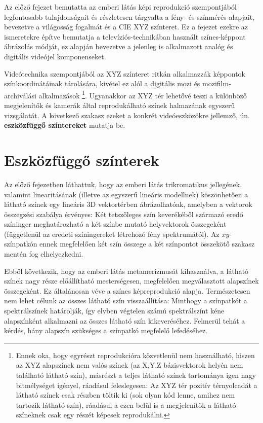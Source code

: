 Az előző fejezet bemutatta az emberi látás képi reprodukció szempontjából legfontosabb tulajdonságait és részletesen tárgyalta a fény- és színmérés alapjait, bevezetve a világosság fogalmát és a CIE XYZ színteret.
Ez a fejezet ezekre az ismeretekre építve bemutatja a televíziós-technikában használt színes-képpont ábrázolás módját, 
ez alapján bevezetve a jelenleg is alkalmazott analóg és digitális videójel komponenseket.

Videótechnika szempontjából az XYZ színteret ritkán alkalmazzák képpontok színkoordinátáinak tárolására, kivétel ez alól a digitális mozi és mozifilm-archiválási alkalmazások \footnote{Ennek oka, hogy egyrészt reprodukcióra közvetlenül nem használható, hiszen az XYZ alapszínek nem valós színek (az X,Y,Z bázisvektorok helyén nem található látható szín), másrészt a teljes látható színek tartománya igen nagy bitmélységet igényel, ráadásul feleslegesen:
Az XYZ tér pozitív térnyolcadát a látható színek csak részben töltik ki (sok olyan kód lenne, amihez nem tartozik látható szín), ráadásul a ezen belül is a megjelenítők a látható színeknek csak egy részét képesek reprodukálni.}.
Ugyanakkor az XYZ tér lehetővé teszi a különböző megjelenítők és kamerák által reprodukálható színek halmazának egyszerű vizsgálatát.
A következő szakasz ezeket a konkrét videóeszközökre jellemző, ún. \textbf{eszközfüggő színtereket} mutatja be.

\section{Eszközfüggő színterek}

Az előző fejezetben láthattuk, hogy az emberi látás trikromatikus jellegének, valamint linearitásának (illetve az egyszerű lineáris modellnek) köszönhetően a látható színek egy lineáris 3D vektortérben ábrázolhatóak, amelyben a vektorok összegzési szabálya érvényes: 
Két tetszőleges szín keverékéből származó eredő színinger meghatározható a két színbe mutató helyvektorok összegeként (függetlenül az eredeti színingereket létrehozó fény spektrumától).
Az $xy$-színpatkón ennek megfelelően két szín összege a két színpontot összekötő szakasz mentén fog elhelyezkedni.

Ebből következik, hogy az emberi látás metamerizmusát kihasználva, a látható színek nagy része előállítható mesterségesen, megfelelően megválasztott alapszínek összegeként.
Ez általánosan véve a színes képreprodukció alapja.
Természetesen nem lehet célunk az összes látható szín visszaállítása: 
Minthogy a színpatkót a spektrálszínek határolják, így elvben végtelen számú spektrálszínt kéne alapszínként alkalmazni az összes látható szín kikeveréséhez.
Felmerül tehát a kérdés, hány alapszín szükséges a színpatkó megfelelő lefedéséhez.

